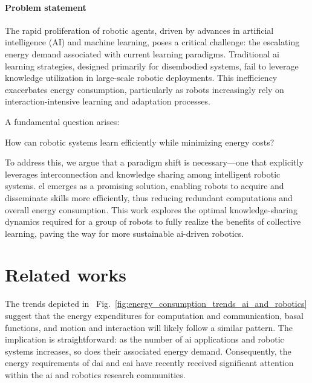 \documentclass[12pt]{article}
\newtheorem{assumption}{Assumption}
\begin{document}
\paragraph*{\textbf{Problem statement}}
The rapid proliferation of robotic agents, driven by advances in artificial intelligence (AI) and machine learning, poses a critical challenge: the escalating energy demand associated with current learning paradigms. Traditional \ac{ai} learning strategies, designed primarily for disembodied systems, fail to leverage knowledge utilization in large-scale robotic deployments. This inefficiency exacerbates energy consumption, particularly as robots increasingly rely on interaction-intensive learning and adaptation processes.

A fundamental question arises:
\begin{tcolorbox}
		How can robotic systems learn efficiently while minimizing energy costs?
\end{tcolorbox}
\noindent To address this, we argue that a paradigm shift is necessary---one that explicitly leverages interconnection and knowledge sharing among intelligent robotic systems. \Ac{cl} emerges as a promising solution, enabling robots to acquire and disseminate skills more efficiently, thus reducing redundant computations and overall energy consumption. This work explores the optimal knowledge-sharing dynamics required for a group of robots to fully realize the benefits of collective learning, paving the way for more sustainable \ac{ai}-driven robotics.


\section*{Related works}
The trends depicted in~%
Fig.~\ref{fig:energy_consumption_trends_ai_and_robotics} suggest that the energy expenditures for computation and communication, basal functions, and motion and interaction will likely follow a similar pattern. The implication is straightforward: as the number of \acl{ai} applications and robotic systems increases, so does their associated energy demand. Consequently, the energy requirements of \acl{dai} and \acl{eai} have recently received significant attention within the \acl{ai} and robotics research communities.
\end{document}
